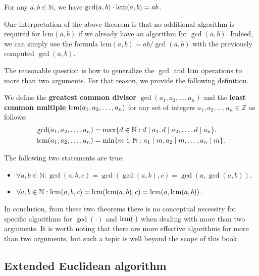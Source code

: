 \documentclass[../lecture-notes-148x210.tex]{subfiles}
\begin{document}
\begin{theorem}
    For any $a, b \in \mathbb{N}$, we have $\text{gcd}(a, b) \cdot \text{lcm}(a, b) = ab$.
\end{theorem}

One interpretation of the above theorem is that no additional algorithm is required for
$\text{lcm}(a, b)$ if we already have an algorithm for $\gcd(a, b)$. Indeed, we
can simply use the formula $\text{lcm}(a, b) = ab / \gcd(a, b)$ with the
previously computed $\gcd(a, b)$.

The reasonable question is how to generalize the $\gcd$ and $\text{lcm}$ operations to more than two arguments. 
For that reason, we provide the following definition.
\begin{definition}
    We define the \textbf{greatest common divisor} $\gcd(a_1, a_2, \dots, a_n)$ and the \textbf{least common multiple} $\text{lcm}(a_1, a_2, \dots, a_n)$ for any set of integers $a_1, a_2, \dots, a_n \in \mathbb{Z}$ as follows:
    \begin{align*}
        \text{gcd}(a_1, a_2, \dots, a_n) &= \max\{ d \in \mathbb{N}: d \mid a_1, d \mid a_2, \dots, d \mid a_n \}. \\
        \text{lcm}(a_1, a_2, \dots, a_n) &= \min\{ m \in \mathbb{N}: a_1 \mid m, a_2 \mid m, \dots, a_n \mid m \}.
    \end{align*}
\end{definition}

\begin{theorem}
    The following two statements are true:
    \begin{itemize}
        \item $\forall a, b \in \mathbb{N}: \gcd(a, b, c) = \gcd(\gcd(a, b), c) = \gcd(a, \gcd(a, b))$.
        \item $\forall a, b \in \mathbb{N}: \text{lcm}(a, b, c) = \text{lcm}(\text{lcm}(a, b), c) = \text{lcm}(a, \text{lcm}(a, b))$.
    \end{itemize}
\end{theorem}

In conclusion, from these two theorems there is no conceptual necessity for
specific algorithms for $\gcd(\cdot)$ and $\text{lcm}(\cdot)$ when dealing with more
than two arguments. It is worth noting that there are more effective algorithms
for more than two arguments, but such a topic is well beyond the scope of this
book.

\subsection{Extended Euclidean algorithm}
\end{document}
